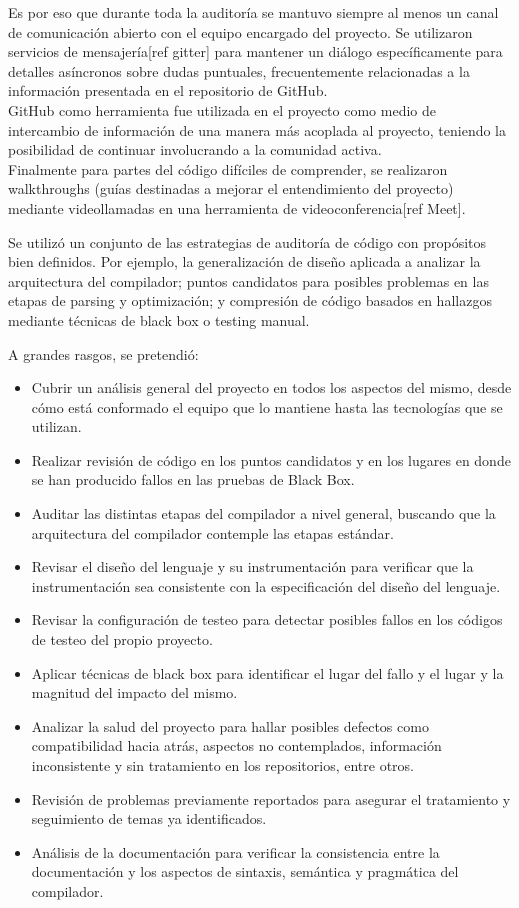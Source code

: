 Es por eso que durante toda la auditoría se mantuvo siempre al menos un canal de comunicación abierto con el equipo encargado del proyecto. Se utilizaron servicios de mensajería[ref gitter] para mantener un diálogo específicamente para detalles asíncronos sobre dudas puntuales, frecuentemente relacionadas a la información presentada en el repositorio de GitHub.\\

GitHub como herramienta fue utilizada en el proyecto como medio de intercambio de información de una manera más acoplada al proyecto, teniendo la posibilidad de continuar involucrando a la comunidad activa.\\

Finalmente para partes del código difíciles de comprender, se realizaron walkthroughs (guías destinadas a mejorar el entendimiento del proyecto) mediante videollamadas en una herramienta de videoconferencia[ref Meet]. 

Se utilizó un conjunto de las estrategias de auditoría de código con propósitos bien definidos. Por ejemplo, la generalización de diseño aplicada a analizar la arquitectura del compilador; puntos candidatos para posibles problemas en las etapas de parsing y optimización; y compresión de código basados en hallazgos mediante técnicas de black box o testing manual.

A grandes rasgos, se pretendió:
\begin{itemize}
    \item Cubrir un análisis general del proyecto en todos los aspectos del mismo, desde cómo está conformado el equipo que lo mantiene hasta las tecnologías que se utilizan.
    \item Realizar revisión de código en los puntos candidatos y en los lugares en donde se han  producido fallos en las pruebas de Black Box.
    \item Auditar las distintas etapas del compilador a nivel general, buscando que la arquitectura del compilador contemple las etapas estándar.
    \item Revisar el diseño del lenguaje y su instrumentación para verificar que la instrumentación sea consistente con la especificación del diseño del lenguaje.
    \item Revisar la configuración de testeo para detectar posibles fallos en los códigos de testeo del propio proyecto.
    \item Aplicar técnicas de black box para identificar el lugar del fallo y el lugar y la magnitud del impacto del mismo.
    \item Analizar la salud del proyecto para hallar posibles defectos como compatibilidad hacia atrás, aspectos no contemplados, información inconsistente y sin tratamiento en los repositorios, entre otros.
    \item Revisión de problemas previamente reportados para asegurar el tratamiento y seguimiento de temas ya identificados.
    \item Análisis de la documentación para verificar la consistencia entre la documentación y los aspectos de sintaxis, semántica y pragmática del compilador.
\end{itemize}
\bigskip

